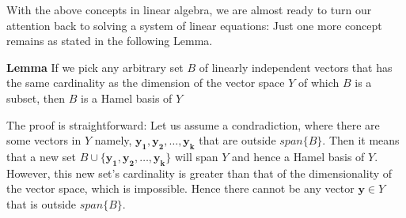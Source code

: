 With the above concepts in linear algebra, we are almost ready to turn our attention back to solving a system of linear equations: Just one more concept remains as stated in the following Lemma.
	\begin{highlightedText}
	\textbf{Lemma} If we pick any arbitrary set \(B\) of linearly independent vectors that has the same cardinality as the dimension of the vector space \(Y\) of which \(B\) is a subset, then \(B\) is a Hamel basis of \(Y\)
	\end{highlightedText}
The proof is straightforward: Let us assume a condradiction, where there are some vectors in \(Y\) namely, \(\mathbf{y_1}, \mathbf{y_2}, \ldots, \mathbf{y_k}\) that are outside \(span\{B\}\). Then it means that a new set \( B \cup \{ \mathbf{y_1}, \mathbf{y_2}, \ldots, \mathbf{y_k} \} \) will span \(Y\) and hence a Hamel basis of \(Y\). However, this new set's cardinality is greater than that of the dimensionality of the vector space, which is impossible. Hence there cannot be any vector \(\mathbf{y} \in Y\) that is outside \(span\{B\}\). 

